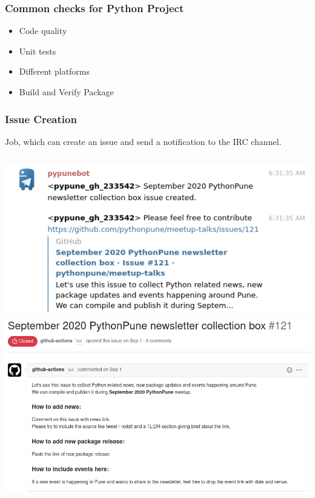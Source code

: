 \documentclass[gray]{beamer}
\begin{document}
\begin{frame}
  \frametitle{Common checks for Python Project}

   \begin{itemize}
    \item Code quality
    \item Unit tests
    \item Different platforms
    \item Build and Verify Package
   \end{itemize}
\end{frame}

\begin{frame}
 \frametitle{Issue Creation}
Job, which can create an issue and send a notification to the IRC channel.

\vspace{1cm}

\begin{columns}
\includegraphics[width=\textwidth]{telegram.png}
\includegraphics[width=\textwidth]{issue.png}
\end{columns}
\end{frame}
\end{document}
